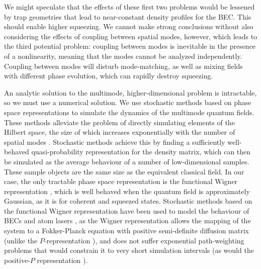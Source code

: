 \documentclass{iopart}
\begin{document}
We might speculate that the effects of these first two problems would be lessened by trap geometries that lead to near-constant density profiles for the BEC.  This should enable higher squeezing.  We cannot make strong conclusions without also considering the effects of coupling between spatial modes, however, which leads to the third potential problem: coupling between modes is inevitable in the presence of a nonlinearity, meaning that the modes cannot be analyzed independently. Coupling between modes will disturb mode-matching, as well as mixing fields with different phase evolution, which can rapidly destroy squeezing.  

An analytic solution to the multimode, higher-dimensional problem is intractable, so we must use a numerical solution.  We use stochastic methods based on phase space representations to simulate the dynamics of the multimode quantum fields.  These methods alleviate the problem of directly simulating elements of the Hilbert space, the size of which increases exponentially with the number of spatial modes \cite{gardiner1991, steelET1998}.  Stochastic methods achieve this by finding a sufficiently well-behaved quasi-probability representation for the density matrix, which can then be simulated as the average behaviour of a number of low-dimensional samples.  These sample objects are the same size as the equivalent classical field.  In our case, the only tractable phase space representation is the functional Wigner representation \cite{steelET1998}, which is well behaved when the quantum field is approximately Gaussian, as it is for coherent and squeezed states.  Stochastic methods based on the functional Wigner representation have been used to model the behaviour of BECs and atom lasers \cite{johnssonET2007,dallET2009,dennisET2010}, as the Wigner representation allows the mapping of the system to a Fokker-Planck equation with positive semi-definite diffusion matrix (unlike the $P$-representation \cite{gardiner1991}), and does not suffer exponential path-weighting problems that would constrain it to very short simulation intervals (as would the positive-$P$ representation \cite{gardiner1991}).
\end{document}
